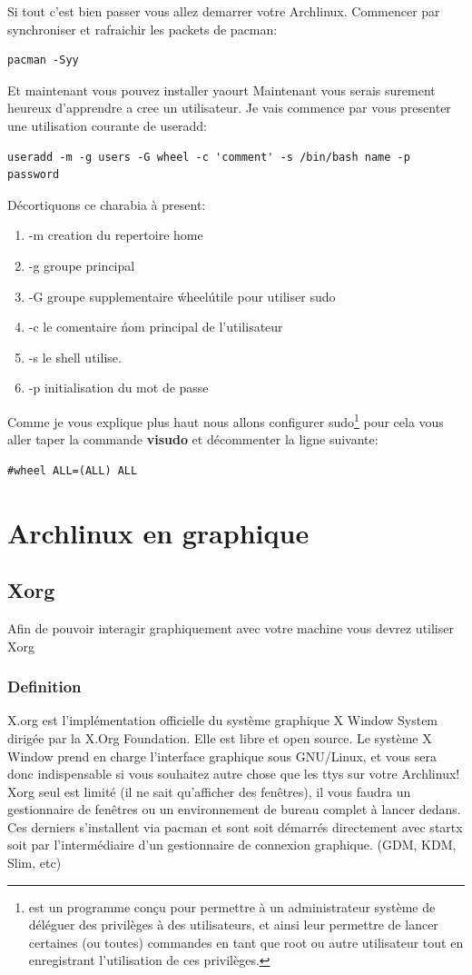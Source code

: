 \documentclass[a4paper]{book}
\begin{document}
Si tout c'est bien passer vous allez demarrer votre Archlinux.
Commencer par synchroniser et rafraichir les packets de pacman\@:\\
\begin{lstlisting}
pacman -Syy
\end{lstlisting}
Et maintenant vous pouvez installer yaourt
Maintenant vous serais surement heureux d'apprendre a cree un utilisateur.
Je vais commence par vous presenter une utilisation courante de useradd\@:\\
\begin{lstlisting}
useradd -m -g users -G wheel -c 'comment' -s /bin/bash name -p password
\end{lstlisting}
Décortiquons ce charabia à present\@:
\begin{enumerate}
  \item -m creation du repertoire home
  \item -g groupe principal
  \item -G groupe supplementaire \'wheel\' utile pour utiliser sudo
  \item -c le comentaire \' nom principal de l'utilisateur
  \item -s le shell utilise.
  \item -p initialisation du mot de passe
\end{enumerate}
Comme je vous explique plus haut nous allons configurer sudo\footnote{est un
  programme conçu pour permettre à un administrateur système de déléguer des
  privilèges à des utilisateurs, et ainsi leur permettre de lancer certaines
  (ou toutes) commandes en tant que root ou autre utilisateur tout en
enregistrant l'utilisation de ces privilèges.}
pour cela vous aller taper la commande \textbf{visudo}
et décommenter la ligne suivante\@:\\
\begin{lstlisting}
#wheel ALL=(ALL) ALL
\end{lstlisting}
\part{Archlinux en graphique}
\chapter{Xorg}
Afin de pouvoir interagir graphiquement avec votre machine vous devrez
utiliser Xorg
\section{Definition}
X.org est l'implémentation officielle du système graphique X Window System 
dirigée par la X.Org Foundation. Elle est libre et open source. Le système X 
Window prend en charge l'interface graphique sous GNU/Linux, et vous sera donc
indispensable si vous souhaitez autre chose que les ttys sur votre Archlinux!
\\
Xorg seul est limité (il ne sait qu'afficher des fenêtres), il vous faudra un 
gestionnaire de fenêtres ou un environnement de bureau complet à lancer dedans.
\\
Ces derniers s'installent via pacman et sont soit démarrés directement avec 
startx soit par l’intermédiaire d’un gestionnaire de connexion graphique. 
(GDM, KDM, Slim, etc)
\end{document}
